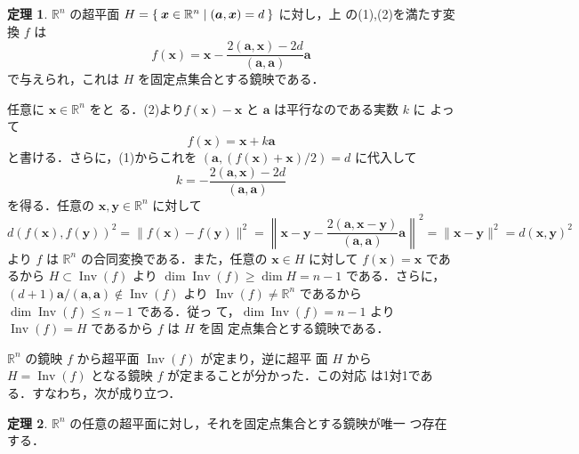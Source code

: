 \documentclass[11pt, uplatex, dvipdfmx, titlepage]{jsarticle}
\makeatletter
\DeclareMathOperator{\Inv}{Inv}
\renewenvironment{proof}[1][\proofname]{\par
  \pushQED{\qed}%
  \normalfont \topsep6\p@\@plus6\p@\relax
  \trivlist
  \item[\hskip\labelsep
         \bfseries
    {#1}]\ignorespaces
}{%
  \popQED\endtrivlist\@endpefalse
}
\theoremstyle{definition}
\newtheorem{theorem}{定理}[section]
\renewcommand{\proofname}{\textbf{証明}}
\makeatother
\begin{document}
\begin{theorem}\label{thm:ref-equation}
  $\mathbb{R}^n$ の超平面
  $H=\Set{\bm{x} \in \mathbb{R}^n | (\bm{a}, \bm{x})=d}$ に対し，上
  の(1),(2)を満たす変換 $f$ は
  \[
    f(\bm{x}) = \bm{x} - \frac{2(\bm{a}, \bm{x}) - 2d}{(\bm{a}, \bm{a})} \bm{a}
  \]
  で与えられ，これは $H$ を固定点集合とする鏡映である．
\end{theorem}
\begin{proof}
  任意に $\bm{x} \in \mathbb{R}^n$ をと
  る．(2)より$f(\bm{x})-\bm{x}$ と $\bm{a}$ は平行なのである実数 $k$ に
  よって
  \[
    f(\bm{x}) = \bm{x} + k \bm{a}
  \]
  と書ける．さらに，(1)からこれを $\left( \bm{a}, \left(f(\bm{x})+\bm{x}\right)/2\right)=d$ に代入して
  \[
    k = -\frac{2(\bm{a},\bm{x})-2d}{(\bm{a},\bm{a})}
  \]
  を得る．任意の $\bm{x},
  \bm{y} \in \mathbb{R}^n$ に対して
  \[
    d(f(\bm{x}), f(\bm{y}))^2 = \|f(\bm{x}) - f(\bm{y})\|^2
    = \left\|\bm{x} - \bm{y} - \frac{2\left(\bm{a}, \bm{x}-\bm{y}\right)}{(\bm{a}, \bm{a})} \bm{a}\right\|^2
    = \|\bm{x}-\bm{y}\|^2 = d(\bm{x}, \bm{y})^2
  \]
  より $f$ は $\mathbb{R}^n$ の合同変換である．また，任意の $\bm{x}
  \in H$ に対して $f(\bm{x}) = \bm{x}$ であるから $H \subset \Inv(f)$
  より $\dim \Inv(f) \geq \dim H = n-1$
  である．さらに，$(d+1)\bm{a}/(\bm{a}, \bm{a}) \notin \Inv(f)$ より $\Inv(f) \neq
  \mathbb{R}^n$ であるから $\dim \Inv(f) \leq n-1$ である．従っ
  て，$\dim\Inv(f) = n-1$ より $\Inv(f) = H$ であるから $f$ は $H$ を固
  定点集合とする鏡映である．
\end{proof}

$\mathbb{R}^n$ の鏡映 $f$ から超平面 $\Inv(f)$ が定まり，逆に超平
面 $H$ から $H=\Inv(f)$ となる鏡映 $f$ が定まることが分かった．この対応
は1対1である．すなわち，次が成り立つ．

\begin{theorem}\label{thm:ref-hyperplane}
  $\mathbb{R}^n$ の任意の超平面に対し，それを固定点集合とする鏡映が唯一
  つ存在する．
\end{theorem}
\end{document}
